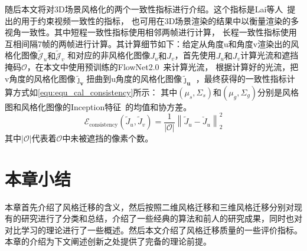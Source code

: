 \par 随后本文将对3D场景风格化的两个一致性指标进行介绍。这个指标是Lai等人~\cite{lai2018learning}提出的用于约束视频一致性的指标，
也可用在3D场景渲染的结果中以衡量渲染的多视角一致性。其中短程一致性指标使用相邻两帧进行计算，
长程一致性指标使用互相间隔7帧的两帧进行计算。其计算细节如下：给定从角度u和角度v渲染出的风格化图像\(\tilde{\mathcal{J}}_u\text{和}\tilde{\mathcal{J}}_v\)
和对应的非风格化图像\(J_u\text{和}J_v\)，首先使用\(J_u\text{和}J_v\)计算光流和遮挡掩码$\mathcal{O}$，在本文中使用预训练的FlowNet2.0~\cite{ilg2017flownet}来计算光流，
根据计算好的光流，把v角度的风格化图像\(\tilde{\boldsymbol{\jmath}}_{\boldsymbol{v}}\)扭曲到u角度的风格化图像\(\tilde{\boldsymbol{\jmath}}_{\boldsymbol{u}}\)
，最终获得的一致性指标计算方式如\autoref{equ:equ_cal_consistency}所示：
其中\((\mu_s,\Sigma_s)\text{和}(\mu_g,\Sigma_g)\)分别是风格图和风格化图像的Inception特征~\cite{szegedy2016rethinking}的均值和协方差。
\begin{equation}
    \label{equ:equ_cal_consistency}
    \mathcal{E}_\text{consistency}{(\tilde{J}_u,\tilde{J}_v)}=\frac1{|\mathcal{O}|}\left\|\tilde{J}_u-\check{J}_u\right\|_2^2
\end{equation}
其中$|\mathcal{O}|$代表着$\mathcal{O}$中未被遮挡的像素个数。


\section{本章小结}
本章首先介绍了风格迁移的含义，然后按照二维风格迁移和三维风格迁移分别对现有的研究进行了分类和总结，介绍了一些经典的算法和前人的研究成果，同时也对对比学习的理论进行了一些概述。然后本文介绍了风格迁移质量的一些评价指标。本章的介绍为下文阐述创新之处提供了完备的理论前提。 




